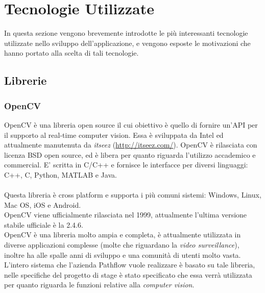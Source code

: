 {\section{Tecnologie Utilizzate} \label{sec:tecnologie}
In questa sezione vengono brevemente introdotte le più interessanti tecnologie utilizzate nello sviluppo dell'applicazione, e vengono esposte le motivazioni che hanno portato alla scelta di tali tecnologie.
\subsection{Librerie}
\subsubsection{OpenCV}
OpenCV è una libreria open source il cui obiettivo è quello di fornire un'API per il supporto al real-time computer vision. Essa è sviluppata da Intel ed attualmente manutenuta da \textit{itseez} (\url{http://itseez.com/}). OpenCV è rilasciata con licenza BSD open source, ed è libera per quanto riguarda l'utilizzo accademico e commercial. E' scritta in C/C++ e fornisce le interfacce per diversi linguaggi: C++, C, Python, MATLAB e Java. \\ \\
Questa libreria è cross platform e supporta i più comuni sistemi: Windows, Linux, Mac OS, iOS e Android. \\ 
OpenCV viene ufficialmente rilasciata nel 1999, attualmente l'ultima versione stabile ufficiale è la 2.4.6. \\
OpenCV è una libreria molto ampia e completa, è attualmente utilizzata in diverse applicazioni complesse (molte che riguardano la \textit{video surveillance}), inoltre ha alle spalle anni di sviluppo e una comunità di utenti molto vasta. \\
L'intero sistema che l'azienda Pathflow vuole realizzare è basato su tale libreria, nelle specifiche del progetto di stage è stato specificato che essa verrà utilizzata per quanto riguarda le funzioni relative alla \textit{computer vision}. 

}
